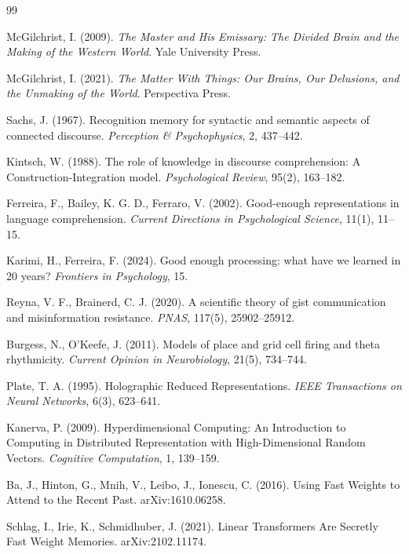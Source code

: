 \documentclass[10pt, twocolumn, a4paper]{article}
\begin{document}
\begin{thebibliography}{99}

McGilchrist, I. (2009).
\emph{The Master and His Emissary: The Divided Brain and the Making of the Western World}. Yale University Press.

McGilchrist, I. (2021).
\emph{The Matter With Things: Our Brains, Our Delusions, and the Unmaking of the World}. Perspectiva Press.

Sachs, J. (1967). Recognition memory for syntactic and semantic aspects of connected discourse. \emph{Perception \& Psychophysics}, 2, 437--442.

Kintsch, W. (1988). The role of knowledge in discourse comprehension: A Construction-Integration model. \emph{Psychological Review}, 95(2), 163--182.

Ferreira, F., Bailey, K. G. D., Ferraro, V. (2002). Good-enough representations in language comprehension. \emph{Current Directions in Psychological Science}, 11(1), 11--15.

Karimi, H., Ferreira, F. (2024). Good enough processing: what have we learned in 20 years? \emph{Frontiers in Psychology}, 15.

Reyna, V. F., Brainerd, C. J. (2020). A scientific theory of gist communication and misinformation resistance. \emph{PNAS}, 117(5), 25902--25912.

Burgess, N., O'Keefe, J. (2011). Models of place and grid cell firing and theta rhythmicity. \emph{Current Opinion in Neurobiology}, 21(5), 734--744.

Plate, T. A. (1995). Holographic Reduced Representations. \emph{IEEE Transactions on Neural Networks}, 6(3), 623--641.

Kanerva, P. (2009). Hyperdimensional Computing: An Introduction to Computing in Distributed Representation with High-Dimensional Random Vectors. \emph{Cognitive Computation}, 1, 139--159.

Ba, J., Hinton, G., Mnih, V., Leibo, J., Ionescu, C. (2016). Using Fast Weights to Attend to the Recent Past. arXiv:1610.06258.

Schlag, I., Irie, K., Schmidhuber, J. (2021). Linear Transformers Are Secretly Fast Weight Memories. arXiv:2102.11174.


\end{thebibliography}
\end{document}

